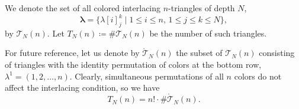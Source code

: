 \documentclass[10pt,a4paper]{amsart}
\numberwithin{equation}{section}
\theoremstyle{definition}
\begin{document}
	We denote the set of all colored interlacing $n$-triangles of depth $N$,
	\[
		\boldsymbol\lambda=\bigl\{\lambda[i]^{k}_{j}\mid 1\le i\le n,\, 1\le
		j\le k\le N\bigr\},
	\]
	by
	$\mathcal{T}_N(n)$.
	Let $T_N(n)\coloneqq\#\mathcal{T}_N(n)$ be the number of such triangles.

	
For future reference, let us denote by $\mathring{\mathcal{T}}_N(n)$ the subset
of $\mathcal{T}_N(n)$ consisting of triangles with the identity permutation of
colors at the bottom row, $\lambda^1 = (1,2,\dots,n)$.
Clearly, simultaneous permutations of all $n$ colors do not affect the
interlacing condition, so we have
\begin{equation}
	\label{eq:fixed_bottom_row} T_N(n) = n!
                                        \cdot \# \mathring{\mathcal{T}}_N(n).
\end{equation}
\end{document}
